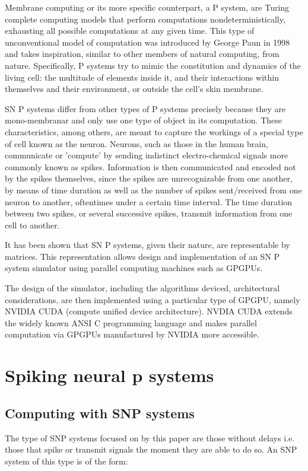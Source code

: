 \documentclass{acm_proc_article-sp}
\begin{document}
Membrane computing or its more specific counterpart, a P system, are Turing complete computing models that perform computations nondeterministically, exhausting all possible  computations at any given time. This type of unconventional model of computation was introduced by George Paun in 1998 and takes inspiration, similar to other members of natural computing, from nature\cite{introtomem}\cite{ppage}. Specifically, P systems try to mimic the constitution and dynamics of the living cell: the multitude of elements inside it, and their interactions within themselves and their environment, or outside the cell's skin membrane.

SN P systems differ from other types of P systems precisely because they are mono-membranar  and only use one type of object in its computation. These characteristics, among others, are meant to capture the workings of a special type of cell known as the neuron. Neurons, such as those in the human brain, communicate or 'compute' by sending indistinct electro-chemical  signals more commonly known as spikes. Information is then communicated and encoded not by the spikes themselves, since the spikes are unrecognizable from one another, by means of time duration as well as the number of spikes sent/received from one neuron to another, oftentimes under a certain time interval\cite{snp}. The time duration between two spikes, or several successive spikes, transmit information from one cell to another.  

It has been shown that SN P systems, given their nature, are representable by matrices\cite{snpbrain}\cite{snpmat}. This representation allows design and implementation of an SN P system simulator using parallel computing machines such as GPGPUs. 

The design of the simulator, including the algorithms deviced, architectural considerations, are then implemented using a particular type of GPGPU, namely NVIDIA CUDA (compute unified device architecture). NVDIA CUDA extends the widely known ANSI C programming language and makes parallel computation via GPGPUs manufactured by NVIDIA more accessible.

\section{Spiking neural p systems}

\subsection{Computing with SNP systems}
The type of SNP systems focused on by this paper are those without delays i.e. those that spike or transmit signals the moment they are able to do so. An SNP system of this type is of the form:
\end{document}
